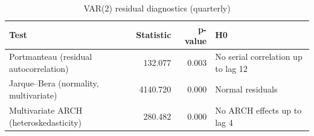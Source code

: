 \begin{table}

\caption{\label{tab:diagnostics}VAR(2) residual diagnostics (quarterly)}
\centering
\begin{tabular}[t]{lrrl}
\toprule
Test & Statistic & p-value & H0\\
\midrule
Portmanteau (residual autocorrelation) & 132.077 & 0.003 & No serial correlation up to lag 12\\
Jarque--Bera (normality, multivariate) & 4140.720 & 0.000 & Normal residuals\\
Multivariate ARCH (heteroskedasticity) & 280.482 & 0.000 & No ARCH effects up to lag 4\\
\bottomrule
\end{tabular}
\end{table}
